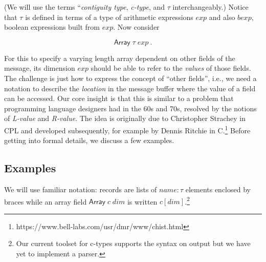 \documentclass[svgnames]{llncs}
\newcommand{\ie}{i.e.}
\newcommand{\konst}[1]{\ensuremath{\mathsf{#1}}}
\begin{document}
(We will use the terms ``\emph{contiguity type}, \emph{c-type}, and $\tau$
interchangeably.) Notice that $\tau$ is defined in terms of a type of
arithmetic expressions $\mathit{exp}$ and also $\mathit{bexp}$,
boolean expressions built from $\mathit{exp}$. Now consider

\[
 \konst{Array} \; \tau \; \mathit{exp} \ .
\]

\noindent For this to specify a varying length array dependent on
other fields of the message, its dimension $\mathit{exp}$ should be
able to refer to the \emph{values} of those fields. The challenge is
just how to express the concept of ``other fields'', \ie, we need a
notation to describe the \emph{location} in the message buffer where
the value of a field can be accessed. Our core insight is that this is
similar to a problem that programming language designers had in the
60s and 70s, resolved by the notions of \emph{L-value} and
\emph{R-value}. The idea is originally due to Christopher Strachey in
CPL and developed subsequently, for example by Dennis Ritchie in
C.\footnote{https://www.bell-labs.com/usr/dmr/www/chist.html} Before
getting into formal details, we discuss a few examples.

\subsection{Examples}

We will use familiar notation: records are lists of $\mathit{name} :
\tau$ elements enclosed by braces while an array field
$\konst{Array}\;c\;\mathit{dim}$ is written $c [\mathit{dim}]$.\footnote{Our
current toolset for c-types supports the syntax on output but we have
yet to implement a parser.}
\end{document}
